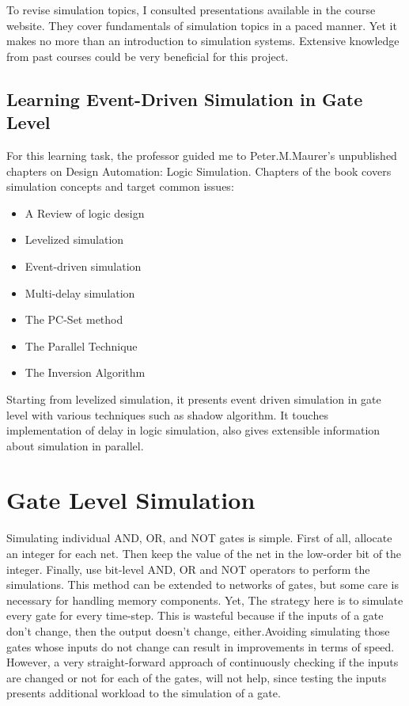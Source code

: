 \documentclass[12pt]{report}
\begin{document}
 To revise simulation topics, I consulted presentations available in the course website. They cover fundamentals of simulation topics in a paced manner. Yet it makes no more than an introduction to simulation systems. Extensive knowledge from past courses could be very beneficial for this project. 
 
 \subsection{Learning Event-Driven Simulation in Gate Level}
 
 For this learning task, the professor guided me to Peter.M.Maurer's unpublished chapters on Design Automation: Logic Simulation. Chapters of the book covers simulation concepts and target common issues:
 \begin{itemize}
 \item A Review of logic design
 \item Levelized simulation
 \item Event-driven simulation
 \item Multi-delay simulation
 \item The PC-Set method
 \item The Parallel Technique
 \item The Inversion Algorithm
 \end{itemize} 
 
 Starting from levelized simulation, it presents event driven simulation in gate level with various techniques such as shadow algorithm. It touches implementation of delay in logic simulation, also gives extensible information about simulation in parallel.
 
 \section{Gate Level Simulation}
 
 Simulating individual AND, OR, and NOT gates is simple. First of all, allocate an integer for each net. Then keep the value of the net in the low-order bit of the integer. Finally, use bit-level AND, OR and NOT operators to perform the simulations. This method can be extended to networks of gates, but some care is necessary for handling memory components. Yet, The strategy here is to simulate every gate for every time-step. This is wasteful because if the inputs of a gate don't change, then the output doesn't change, either.Avoiding simulating those gates whose inputs do not change can result in improvements in terms of speed. However, a very straight-forward approach of continuously checking if the inputs are changed or not for each of the gates, will not help, since testing the inputs presents additional workload to the simulation of a gate. 
 
\end{document}
